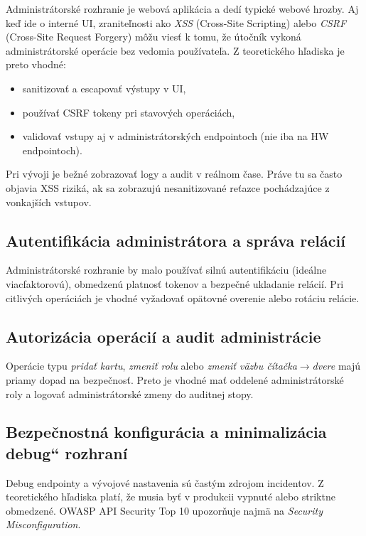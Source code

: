 \documentclass[journal,a4paper,onecolumn]{IEEEtran}
\newcommand{\uv}[1]{\quotedblbase#1\textquotedblleft}
\begin{document}
Administrátorské rozhranie je webová aplikácia a dedí typické webové hrozby. Aj keď ide o interné UI, zraniteľnosti ako \emph{XSS} (Cross-Site Scripting) alebo \emph{CSRF} (Cross-Site Request Forgery) môžu viesť k tomu, že útočník vykoná administrátorské operácie bez vedomia používateľa. Z teoretického hľadiska je preto vhodné:

\begin{itemize}[leftmargin=*,itemsep=2pt]
  \item sanitizovať a escapovať výstupy v UI,
  \item používať CSRF tokeny pri stavových operáciách,
  \item validovať vstupy aj v administrátorských endpointoch (nie iba na HW endpointoch).
\end{itemize}

Pri vývoji je bežné zobrazovať logy a audit v reálnom čase. Práve tu sa často objavia XSS riziká, ak sa zobrazujú nesanitizované reťazce pochádzajúce z vonkajších vstupov.


\subsection{Autentifikácia administrátora a správa relácií}

Administrátorské rozhranie by malo používať silnú autentifikáciu (ideálne viacfaktorovú), obmedzenú platnosť tokenov a bezpečné ukladanie relácií. Pri citlivých operáciách je vhodné vyžadovať opätovné overenie alebo rotáciu relácie.

\subsection{Autorizácia operácií a audit administrácie}

Operácie typu \emph{pridať kartu}, \emph{zmeniť rolu} alebo \emph{zmeniť väzbu čítačka$\rightarrow$dvere} majú priamy dopad na bezpečnosť. Preto je vhodné mať oddelené administrátorské roly a logovať administrátorské zmeny do auditnej stopy.

\subsection{Bezpečnostná konfigurácia a minimalizácia \uv{debug} rozhraní}

Debug endpointy a vývojové nastavenia sú častým zdrojom incidentov. Z teoretického hľadiska platí, že musia byť v produkcii vypnuté alebo striktne obmedzené. OWASP API Security Top 10 upozorňuje najmä na \emph{Security Misconfiguration}.\cite{OWASPAPI2023}
\end{document}
